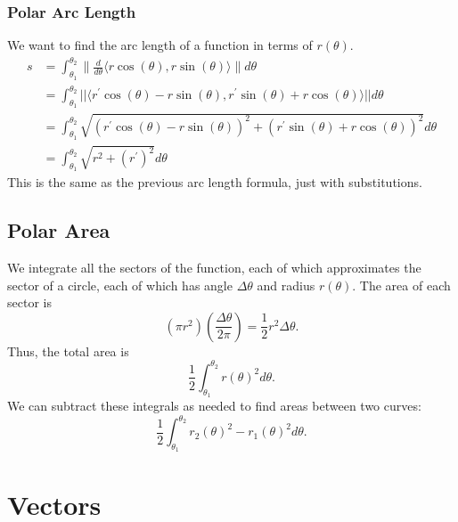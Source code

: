 \documentclass[12pt]{article}
\theoremstyle{plain} %
\theoremstyle{definition}
\theoremstyle{definition}
\theoremstyle{definition}
\theoremstyle{remark}
\begin{document}
\subsubsection{Polar Arc Length}
We want to find the arc length of a function in terms of $r(\theta)$.
\begin{align*}
    s & = \int_{\theta_1}^{\theta_2}{\lVert \frac{d}{d\theta} \langle r\cos{(\theta)}, r\sin{(\theta)} \rangle \rVert d\theta} \\
    & = \int_{\theta_1}^{\theta_2}{|| \langle r^\prime\cos{(\theta)} - r\sin{(\theta)}, r^\prime\sin{(\theta)} + r\cos{(\theta)} \rangle || d\theta} \\
    & = \int_{\theta_1}^{\theta_2}{\sqrt{ (r^\prime\cos{(\theta)} - r\sin{(\theta)})^2+ (r^\prime\sin{(\theta)} + r\cos{(\theta)})^2  } d\theta} \\
    & = \int_{\theta_1}^{\theta_2}{\sqrt{r^2+ (r^\prime)^2}d\theta}
\end{align*}
This is the same as the previous arc length formula, just with substitutions.

\subsection{Polar Area}
We integrate all the sectors of the function, each of which approximates the sector of a circle,
each of which has angle $\Delta \theta$ and radius $r(\theta)$. The area of each sector is
\begin{equation*}
    (\pi r^2)(\frac{\Delta\theta}{2\pi}) = \frac{1}{2}r^2 \Delta\theta.
\end{equation*}
Thus, the total area is
\[
    \frac{1}{2} \int_{\theta_1}^{\theta_2}{r(\theta)^2 d\theta}.
\]
We can subtract these integrals as needed to find areas between two curves:
\[
    \frac{1}{2} \int_{\theta_1}^{\theta_2}{r_2(\theta)^2 - r_1(\theta)^2 d\theta}.
\]

\section{Vectors}
\end{document}
